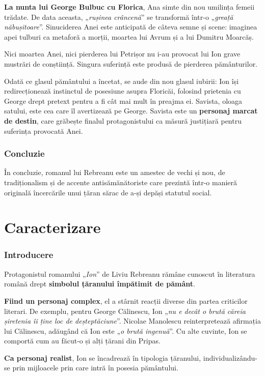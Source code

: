 \documentclass{article}
\newcommand{\qu}[1]{„\emph{#1}”}
\begin{document}
\textbf{La nunta lui George Bulbuc cu Florica}, Ana simte din nou umilința femeii trădate. De data aceasta, \qu{rușinea crâncenă} se transformă într-o \qu{greață năbușitoare}. Sinuciderea Anei este anticipată de câteva semne și scene: imaginea apei tulburi ca metaforă a morții, moartea lui Avrum și a lui Dumitru Moarcăș.

Nici moartea Anei, nici pierderea lui Petrișor nu i-au provocat lui Ion grave mustrări de conștiință. Singura suferință este produsă de pierderea pământurilor.

Odată ce glasul pământului a încetat, se aude din nou glasul iubirii: Ion își redirecționează instinctul de posesiune asupra Floricăi, folosind prietenia cu George drept pretext pentru a fi cât mai mult în preajma ei. Savista, oloaga satului, este cea care îl avertizează pe George. Savista este un \textbf{personaj marcat de destin}, care grăbește finalul protagonistului ca măsură justițiară pentru suferința provocată Anei.
\section{Concluzie}
În concluzie, romanul lui Rebreanu este un amestec de vechi și nou, de tradiționalism și de accente antisămănătoriste care prezintă într-o manieră originală încercările unui țăran sărac de a-și depăși statutul social.

\part*{Caracterizare}
\setcounter{section}{0}
\section{Introducere}
Protagonistul romanului \qu{Ion} de Liviu Rebreanu rămâne cunoscut în literatura română drept \textbf{simbolul țăranului împătimit de pământ}.

\textbf{Fiind un personaj complex}, el a stârnit reacții diverse din partea criticilor literari. De exemplu, pentru George Călinescu, Ion \qu{nu e decât o brută căreia șiretenia îi ține loc de deșteptăciune}. Nicolae Manolescu reinterpretează afirmația lui Călinescu, adăugând că Ion este \qu{o brută ingenuă}. Cu alte cuvinte, Ion se comportă cum au făcut-o și alți țărani din Pripas.

\textbf{Ca personaj realist}, Ion se încadrează în tipologia țăranului, individualizându-se prin mijloacele prin care intră în posesia pământului.
\end{document}
